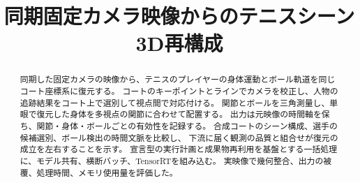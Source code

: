 \documentclass[a4paper,11pt]{ltjsarticle}
\title{同期固定カメラ映像からのテニスシーン3D再構成}
\author{}
\date{}
\begin{document}
\maketitle

\begin{abstract}
同期した固定カメラの映像から、テニスのプレイヤーの身体運動とボール軌道を同じコート座標系に復元する。
コートのキーポイントとラインでカメラを校正し、人物の追跡結果をコート上で選別して視点間で対応付ける。
関節とボールを三角測量し、単眼で復元した身体を多視点の関節に合わせて配置する。
出力は元映像の時間軸を保ち、関節・身体・ボールごとの有効性を記録する。
合成コートのシーン構成、選手の候補選別、ボール検出の時間文脈を比較し、
下流に届く観測の品質と組合せが復元の成立を左右することを示す。
宣言型の実行計画と成果物再利用を基盤とする一括処理に、モデル共有、横断バッチ、TensorRTを組み込む。
実映像で幾何整合、出力の被覆、処理時間、メモリ使用量を評価した。
\end{abstract}













\FloatBarrier

\begingroup
\small

\endgroup

\appendix

\end{document}
